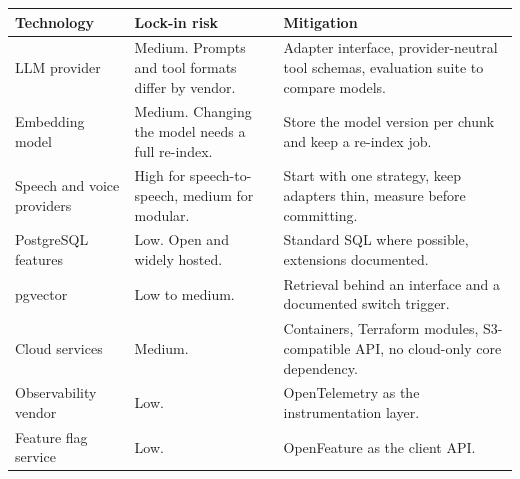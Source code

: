 {\small
\begin{longtable}{@{}>{\raggedright\arraybackslash}p{}>{\raggedright\arraybackslash}p{}>{\raggedright\arraybackslash}p{}@{}}
\toprule
\textbf{Technology} & \textbf{Lock-in risk} & \textbf{Mitigation} \\
\midrule
\endhead
\bottomrule
\endfoot
LLM provider & Medium. Prompts and tool formats differ by vendor. & Adapter interface, provider-neutral tool schemas, evaluation suite to compare models. \\
Embedding model & Medium. Changing the model needs a full re-index. & Store the model version per chunk and keep a re-index job. \\
Speech and voice providers & High for speech-to-speech, medium for modular. & Start with one strategy, keep adapters thin, measure before committing. \\
PostgreSQL features & Low. Open and widely hosted. & Standard SQL where possible, extensions documented. \\
pgvector & Low to medium. & Retrieval behind an interface and a documented switch trigger. \\
Cloud services & Medium. & Containers, Terraform modules, S3-compatible API, no cloud-only core dependency. \\
Observability vendor & Low. & OpenTelemetry as the instrumentation layer. \\
Feature flag service & Low. & OpenFeature as the client API. \\
\end{longtable}
}

